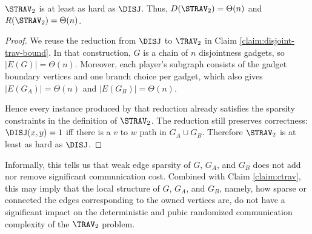 \begin{claim}
\label{claim:strav}
$\STRAV_2$ is at least as hard as $\DISJ$. Thus, $D(\STRAV_2) = \Theta(n)$ and $R(\STRAV_2) = \Theta(n)$.
\end{claim}

\begin{proof}
We reuse the reduction from $\DISJ$ to $\TRAV_2$ in Claim \ref{claim:disjoint-trav-bound}. In that construction, $G$ is a chain of $n$ disjointness gadgets, so $|E(G)| = \Theta(n)$. Moreover, each player's subgraph consists of the gadget boundary vertices and one branch choice per gadget, which also gives $|E(G_A)| = \Theta(n)$ and $|E(G_B)| = \Theta(n)$.

Hence every instance produced by that reduction already satisfies the sparsity constraints in the definition of $\STRAV_2$. The reduction still preserves correctness: $\DISJ(x,y)=1$ iff there is a $v$ to $w$ path in $G_A \cup G_B$. Therefore $\STRAV_2$ is at least as hard as $\DISJ$.
\end{proof}

Informally, this tells us that weak edge sparsity of $G$, $G_A$, and $G_B$ does not add nor remove significant communication cost. Combined with Claim \ref{claim:ctrav}, this may imply that the local structure of $G$, $G_A$, and $G_B$, namely, how sparse or connected the edges corresponding to the owned vertices are, do not have a significant impact on the deterministic and pubic randomized communication complexity of the $\TRAV_2$ problem.
